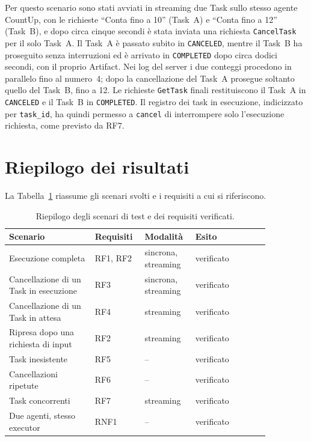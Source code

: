 Per questo scenario sono stati avviati in streaming due Task sullo stesso agente CountUp, con le richieste ``Conta fino a 10'' (Task~A) e ``Conta fino a 12'' (Task~B), e dopo circa cinque secondi è stata inviata una richiesta \texttt{CancelTask} per il solo Task~A. Il Task~A è passato subito in \texttt{CANCELED}, mentre il Task~B ha proseguito senza interruzioni ed è arrivato in \texttt{COMPLETED} dopo circa dodici secondi, con il proprio Artifact. Nei log del server i due conteggi procedono in parallelo fino al numero~4; dopo la cancellazione del Task~A prosegue soltanto quello del Task~B, fino a 12. Le richieste \texttt{GetTask} finali restituiscono il Task~A in \texttt{CANCELED} e il Task~B in \texttt{COMPLETED}. Il registro dei task in esecuzione, indicizzato per \texttt{task\_id}, ha quindi permesso a \texttt{cancel} di interrompere solo l'esecuzione richiesta, come previsto da RF7.

\section{Riepilogo dei risultati}
\label{sec:riepilogo-test}

La Tabella~\ref{tab:riepilogo-test} riassume gli scenari svolti e i requisiti a cui si riferiscono.

\begin{table}[htbp]
    \centering
    \small
    \begin{tabular}{p{0.30\linewidth} p{0.14\linewidth} p{0.16\linewidth} p{0.26\linewidth}}
        \hline
        \textbf{Scenario} & \textbf{Requisiti} & \textbf{Modalità} & \textbf{Esito} \\
        \hline
        Esecuzione completa & RF1, RF2 & sincrona, streaming & verificato \\
        Cancellazione di un Task in esecuzione & RF3 & sincrona, streaming & verificato \\
        Cancellazione di un Task in attesa & RF4 & streaming & verificato \\
        Ripresa dopo una richiesta di input & RF2 & streaming & verificato \\
        Task inesistente & RF5 & -- & verificato \\
        Cancellazioni ripetute & RF6 & -- & verificato \\
        Task concorrenti & RF7 & streaming & verificato \\
        Due agenti, stesso executor & RNF1 & -- & verificato \\
        \hline
    \end{tabular}
    \caption{Riepilogo degli scenari di test e dei requisiti verificati.}
    \label{tab:riepilogo-test}
\end{table}


